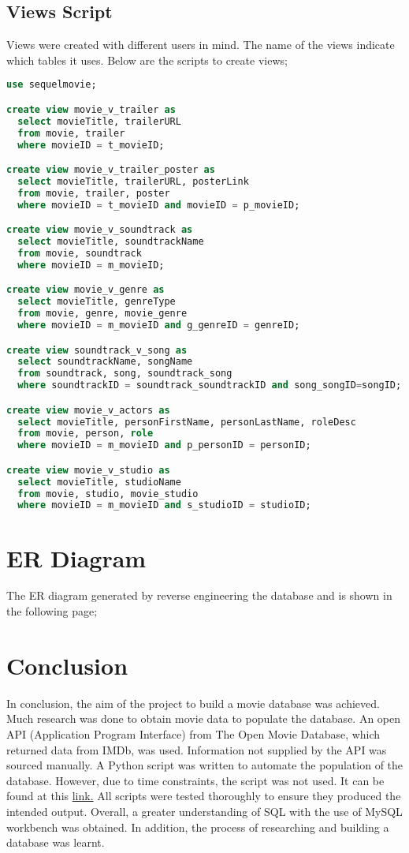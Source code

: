 \documentclass[12pt]{article}
\begin{document}
\subsection{Views Script}
Views were created with different users in mind. The name of the views indicate which tables it uses. Below are the scripts to create views; 
\begin{lstlisting}[language=SQL]
use sequelmovie;

create view movie_v_trailer as
  select movieTitle, trailerURL
  from movie, trailer
  where movieID = t_movieID;

create view movie_v_trailer_poster as
  select movieTitle, trailerURL, posterLink
  from movie, trailer, poster
  where movieID = t_movieID and movieID = p_movieID;

create view movie_v_soundtrack as
  select movieTitle, soundtrackName
  from movie, soundtrack
  where movieID = m_movieID;

create view movie_v_genre as
  select movieTitle, genreType
  from movie, genre, movie_genre
  where movieID = m_movieID and g_genreID = genreID;

create view soundtrack_v_song as
  select soundtrackName, songName
  from soundtrack, song, soundtrack_song
  where soundtrackID = soundtrack_soundtrackID and song_songID=songID;

create view movie_v_actors as
  select movieTitle, personFirstName, personLastName, roleDesc
  from movie, person, role
  where movieID = m_movieID and p_personID = personID;

create view movie_v_studio as
  select movieTitle, studioName
  from movie, studio, movie_studio
  where movieID = m_movieID and s_studioID = studioID;
\end{lstlisting}


\newpage
\section{ER Diagram}
The ER diagram generated by reverse engineering the database and is shown in the following page;



\newpage
\section{Conclusion}
In conclusion, the aim of the project to build a movie database was achieved. Much research was done to obtain movie data to populate the database. An open API (Application Program Interface) from The Open Movie Database, which returned data from IMDb, was used. Information not supplied by the API was sourced manually. A Python script was written to automate the population of the database. However, due to time constraints, the script was not used. It can be found at this \href{https://github.com/ciaranRoche/mySQL-movie-db/tree/master/snake}{link.}\newline\newline
All scripts were tested thoroughly to ensure they produced the intended output. Overall, a greater understanding of SQL with the use of MySQL workbench was obtained. In addition, the process of researching and building a database was learnt. 
\end{document}
